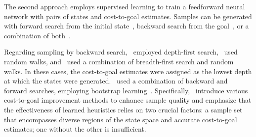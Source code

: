 \documentclass[ppgc,diss,english]{iiufrgs}
\begin{document}
The second approach employs supervised learning to train a feedforward neural network with pairs of states and cost-to-goal estimates. Samples can be generated with forward search from the initial state~\cite{Ferber.etal/2020a}, backward search from the goal~\cite{Yu.etal/2020,OToole/2022,Bettker.etal/2022}, or a combination of both~\cite{Ferber.etal/2022}.


Regarding sampling by backward search,~\citet{Yu.etal/2020} employed depth-first search,~\citet{OToole/2022} used random walks, and~\citet{Bettker.etal/2022} used a combination of breadth-first search and random walks. In these cases, the cost-to-goal estimates were assigned as the lowest depth at which the states were generated.~\citet{Ferber.etal/2022} used a combination of backward and forward searches, employing bootstrap learning~\cite{Arfaee.etal/2011}.
Specifically,~\citet{Bettker.etal/2022} introduce various cost-to-goal improvement methods to enhance sample quality and emphasize that the effectiveness of learned heuristics relies on two crucial factors: a sample set that encompasses diverse regions of the state space and accurate cost-to-goal estimates; one without the other is insufficient.

\end{document}
